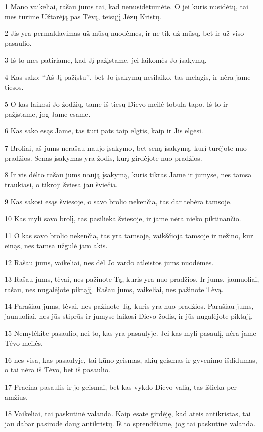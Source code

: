 \par 1 Mano vaikeliai, rašau jums tai, kad nenusidėtumėte. O jei kuris nusidėtų, tai mes turime Užtarėją pas Tėvą, teisųjį Jėzų Kristų. 
\par 2 Jis yra permaldavimas už mūsų nuodėmes, ir ne tik už mūsų, bet ir už viso pasaulio. 
\par 3 Iš to mes patiriame, kad Jį pažįstame, jei laikomės Jo įsakymų. 
\par 4 Kas sako: “Aš Jį pažįstu”, bet Jo įsakymų nesilaiko, tas melagis, ir nėra jame tiesos. 
\par 5 O kas laikosi Jo žodžių, tame iš tiesų Dievo meilė tobula tapo. Iš to ir pažįstame, jog Jame esame. 
\par 6 Kas sako esąs Jame, tas turi pats taip elgtis, kaip ir Jis elgėsi. 
\par 7 Broliai, aš jums nerašau naujo įsakymo, bet seną įsakymą, kurį turėjote nuo pradžios. Senas įsakymas yra žodis, kurį girdėjote nuo pradžios. 
\par 8 Ir vis dėlto rašau jums naują įsakymą, kuris tikras Jame ir jumyse, nes tamsa traukiasi, o tikroji šviesa jau šviečia. 
\par 9 Kas sakosi esąs šviesoje, o savo brolio nekenčia, tas dar tebėra tamsoje. 
\par 10 Kas myli savo brolį, tas pasilieka šviesoje, ir jame nėra nieko piktinančio. 
\par 11 O kas savo brolio nekenčia, tas yra tamsoje, vaikščioja tamsoje ir nežino, kur einąs, nes tamsa užgulė jam akis. 
\par 12 Rašau jums, vaikeliai, nes dėl Jo vardo atleistos jums nuodėmės. 
\par 13 Rašau jums, tėvai, nes pažinote Tą, kuris yra nuo pradžios. Ir jums, jaunuoliai, rašau, nes nugalėjote piktąjį. Rašau jums, vaikeliai, nes pažinote Tėvą. 
\par 14 Parašiau jums, tėvai, nes pažinote Tą, kuris yra nuo pradžios. Parašiau jums, jaunuoliai, nes jūs stiprūs ir jumyse laikosi Dievo žodis, ir jūs nugalėjote piktąjį. 
\par 15 Nemylėkite pasaulio, nei to, kas yra pasaulyje. Jei kas myli pasaulį, nėra jame Tėvo meilės, 
\par 16 nes visa, kas pasaulyje, tai kūno geismas, akių geismas ir gyvenimo išdidumas, o tai nėra iš Tėvo, bet iš pasaulio. 
\par 17 Praeina pasaulis ir jo geismai, bet kas vykdo Dievo valią, tas išlieka per amžius. 
\par 18 Vaikeliai, tai paskutinė valanda. Kaip esate girdėję, kad ateis antikristas, tai jau dabar pasirodė daug antikristų. Iš to sprendžiame, jog tai paskutinė valanda. 
